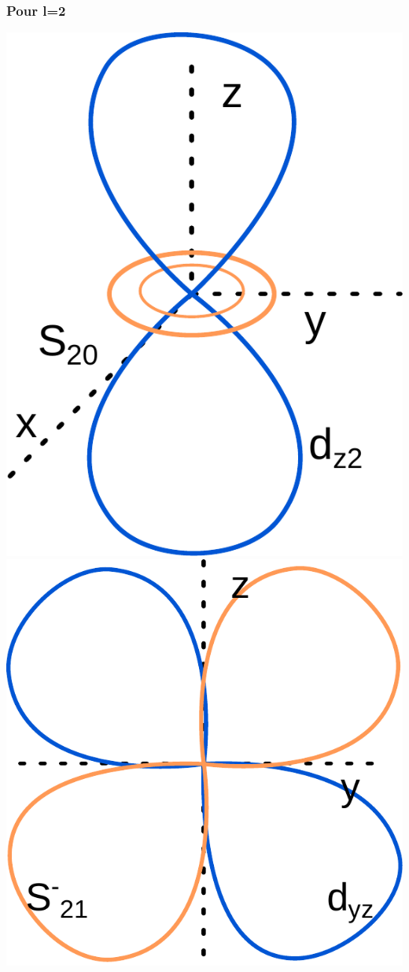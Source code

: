 \documentclass[french]{yLectureNote}
\begin{document}
\subsubsection{Pour l=2}
\includegraphics[scale=0.5]{s20}
\includegraphics[scale=0.5]{s-21}
\end{document}
